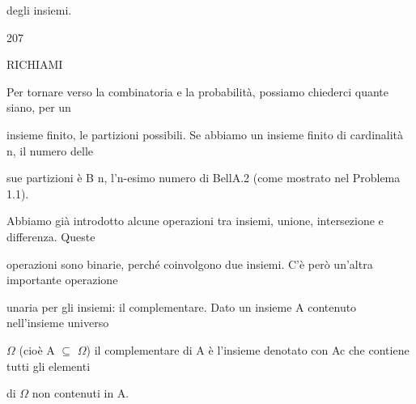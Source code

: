 \documentclass[a4paper,portrait,12pt]{article}
\begin{document}
\begin{flushleft}
degli insiemi.
\end{flushleft}





207










\begin{flushleft}
RICHIAMI
\end{flushleft}





\begin{flushleft}
Per tornare verso la combinatoria e la probabilit\`{a}, possiamo chiederci quante siano, per un
\end{flushleft}


\begin{flushleft}
insieme finito, le partizioni possibili. Se abbiamo un insieme finito di cardinalit\`{a} n, il numero delle
\end{flushleft}


\begin{flushleft}
sue partizioni \`{e} B n, l'n-esimo numero di BellA.2 (come mostrato nel Problema 1.1).
\end{flushleft}


\begin{flushleft}
Abbiamo gi\`{a} introdotto alcune operazioni tra insiemi, unione, intersezione e differenza. Queste
\end{flushleft}


\begin{flushleft}
operazioni sono binarie, perch\'{e} coinvolgono due insiemi. C'\`{e} per\`{o} un'altra importante operazione
\end{flushleft}


\begin{flushleft}
unaria per gli insiemi: il complementare. Dato un insieme A contenuto nell'insieme universo
\end{flushleft}


\begin{flushleft}
$\Omega$ (cio\`{e} A $\subseteq$ $\Omega$) il complementare di A \`{e} l'insieme denotato con Ac che contiene tutti gli elementi
\end{flushleft}


\begin{flushleft}
di $\Omega$ non contenuti in A.
\end{flushleft}
\end{document}
